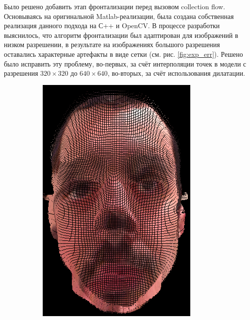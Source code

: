 Было решено добавить этап фронтализации перед вызовом collection flow. Основываясь на оригинальной Matlab-реализации, была создана собственная реализация данного подхода на С++ и OpenCV. В процессе разработки выяснилось, что алгоритм фронтализации был адаптирован для изображений в низком разрешении, в результате на изображениях большого разрешения оставались характерные артефакты в виде сетки (см. рис. \ref{fig:exp_err}). Решено было исправить эту проблему, во-первых, за счёт интерполяции точек в модели с разрешения $320 \times 320$ до $640 \times 640$, во-вторых, за счёт использования дилатации.

\begin{figure}[t]
\centering
	\begin{subfigure}[t]{0.3\textwidth}
		\includegraphics[width=\textwidth]{bad_model_reprojection.png}

\end{subfigure}
\end{figure}

